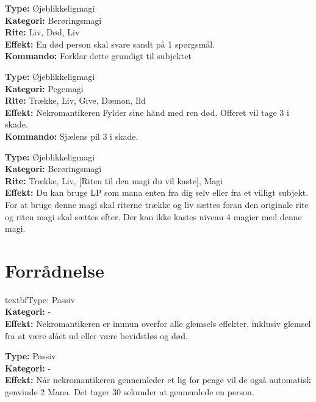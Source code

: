 \begin{nSjæl*}
\textbf{Type:} Øjeblikkeligmagi\\
\textbf{Kategori:} Berøringsmagi\\
\textbf{Rite:} Liv, Død, Liv\\
\textbf{Effekt:} En død person skal svare sandt på 1 spørgsmål.\\
\textbf{Kommando:} Forklar dette grundigt til subjektet
\end{nSjæl*}

\begin{nSjæl*}
\textbf{Type:} Øjeblikkeligmagi\\
\textbf{Kategori:} Pegemagi\\
\textbf{Rite:} Trække, Liv, Give, Dæmon, Ild\\
\textbf{Effekt:} Nekromantikeren Fylder sine hånd med ren død. Offeret vil tage 3 i skade.\\
\textbf{Kommando:} Sjælens pil 3 i skade.\\

\end{nSjæl*}

\begin{nSjæl*}
\textbf{Type:} Øjeblikkeligmagi\\
\textbf{Kategori:} Berøringsmagi\\
\textbf{Rite:} Trække, Liv, [Riten til den magi du vil kaste], Magi\\
\textbf{Effekt:} Du kan bruge LP som mana enten fra dig selv eller fra et villigt subjekt. For at bruge denne magi skal riterne trække og liv sættes foran den originale rite og riten magi skal sættes efter. Der kan ikke kastes niveau 4 magier med denne magi.
\end{nSjæl*}

\section*{Forrådnelse}

\begin{død*}
textbf{Type:} Passiv\\
\textbf{Kategori:} -\\
\textbf{Effekt:} Nekromantikeren er immun overfor alle glemsels effekter, inklusiv glemsel fra at være slået ud eller være bevidstløs og død.
\end{død*}

\begin{død*}
\textbf{Type:} Passiv \\
\textbf{Kategori:} -\\
\textbf{Effekt:} Når nekromantikeren gennemleder et lig for penge vil de også automatisk genvinde 2 Mana. Det tager 30 sekunder at gennemlede en person.\\ 
\end{død*}

